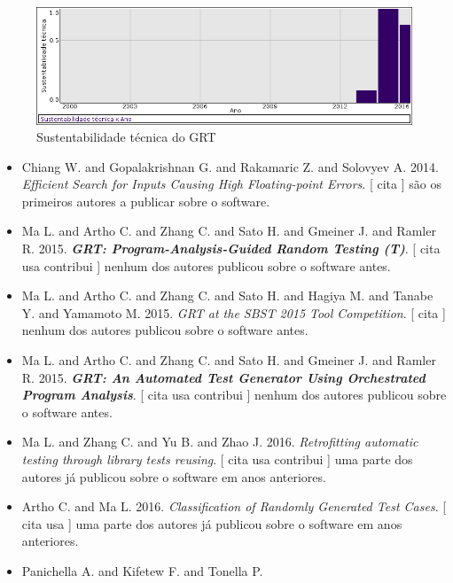 \begin{figure}[h]
  \center
  \includegraphics[scale=0.50]{result-documents/charts/grt.png}
  \caption{Sustentabilidade técnica do GRT}
\end{figure}


\begin{itemize}
\item Chiang W. and Gopalakrishnan G. and Rakamaric Z. and Solovyev A.
      2014.
        \textit{ Efficient Search for Inputs Causing High Floating-point Errors}.
      [
          cita
      ]
são os primeiros autores a publicar sobre o software.
\item Ma L. and Artho C. and Zhang C. and Sato H. and Gmeiner J. and Ramler R.
      2015.
        \textbf{\textit{ GRT: Program-Analysis-Guided Random Testing (T)}}.
      [
          cita
          usa
          contribui
      ]
nenhum dos autores publicou sobre o software antes.
\item Ma L. and Artho C. and Zhang C. and Sato H. and Hagiya M. and Tanabe Y. and Yamamoto M.
      2015.
        \textit{ GRT at the SBST 2015 Tool Competition}.
      [
          cita
      ]
nenhum dos autores publicou sobre o software antes.
\item Ma L. and Artho C. and Zhang C. and Sato H. and Gmeiner J. and Ramler R.
      2015.
        \textbf{\textit{ GRT: An Automated Test Generator Using Orchestrated Program Analysis}}.
      [
          cita
          usa
          contribui
      ]
nenhum dos autores publicou sobre o software antes.
\item Ma L. and Zhang C. and Yu B. and Zhao J.
      2016.
        \textit{ Retrofitting automatic testing through library tests reusing}.
      [
          cita
          usa
          contribui
      ]
uma parte dos autores já publicou sobre o software em anos anteriores.
\item Artho C. and Ma L.
      2016.
        \textit{ Classification of Randomly Generated Test Cases}.
      [
          cita
          usa
      ]
uma parte dos autores já publicou sobre o software em anos anteriores.
\item Panichella A. and Kifetew F. and Tonella P.

\end{itemize}
